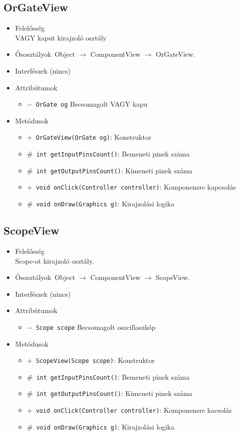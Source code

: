 \subsection{OrGateView}
\begin{itemize}
\item Felelősség\\
VAGY kaput kirajzoló osztály
\item Ősosztályok\ Object $\rightarrow{}$ ComponentView $\rightarrow{}$ OrGateView.
\item Interfészek (nincs)
\item Attribútumok $\ $
\begin{itemize}
	\item[] \texttt{$-$ OrGate og} Becsomagolt VAGY kapu
\end{itemize}
\item Metódusok$\ $
\begin{itemize}
	\item[] \texttt{$+$ OrGateView(OrGate og)}: Konstruktor
	\item[] \texttt{$\#$ int getInputPinsCount()}: Bemeneti pinek száma
	\item[] \texttt{$\#$ int getOutputPinsCount()}: Kimeneti pinek száma
	\item[] \texttt{$+$ void onClick(Controller controller)}: Komponensre kapcsolás
	\item[] \texttt{$\#$ void onDraw(Graphics g)}: Kirajzolási logika
\end{itemize}
\end{itemize}

\subsection{ScopeView}
\begin{itemize}
\item Felelősség\\
Scope-ot kirajzoló osztály.
\item Ősosztályok\ Object $\rightarrow{}$ ComponentView $\rightarrow{}$ ScopeView.
\item Interfészek (nincs)
\item Attribútumok $\ $
\begin{itemize}
	\item[] \texttt{$-$ Scope scope} Becsomagolt oszcilloszkóp
\end{itemize}
\item Metódusok$\ $
\begin{itemize}
	\item[] \texttt{$+$ ScopeView(Scope scope)}: Konstruktor
	\item[] \texttt{$\#$ int getInputPinsCount()}: Bemeneti pinek száma
	\item[] \texttt{$\#$ int getOutputPinsCount()}: Kimeneti pinek száma
	\item[] \texttt{$+$ void onClick(Controller controller)}: Komponensre kacsolás
	\item[] \texttt{$\#$ void onDraw(Graphics g)}: Kirajzolási logika
\end{itemize}
\end{itemize}

